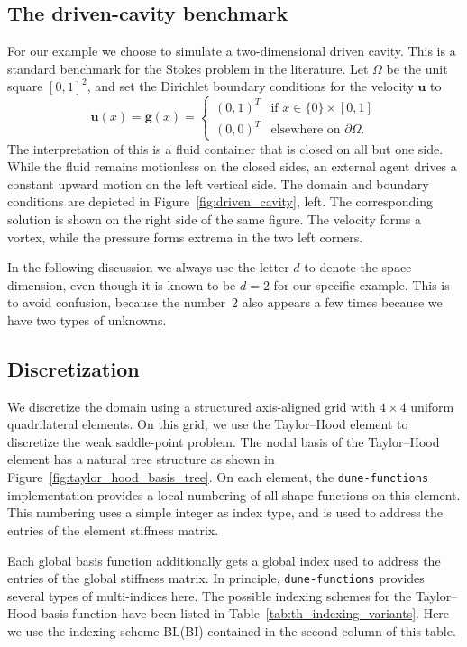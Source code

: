 \documentclass[a4paper,10pt,headings=normal,bibliography=totoc]{scrartcl}
\newcommand{\dunemodule}[1]{\texttt{#1}}
\begin{document}
\subsection{The driven-cavity benchmark}

For our example we choose to simulate a two-dimensional driven cavity.  This is a standard benchmark
for the Stokes problem in the literature.  Let $\Omega$ be the unit square $[0,1]^2$, and set the Dirichlet
boundary conditions for the velocity $\mathbf{u}$ to
\begin{equation*}
 \mathbf{u}(x)
 =\mathbf{g}(x)
 =
 \begin{cases}
  (0,1)^T & \text{if $x \in \{0\} \times [0,1]$} \\
  (0,0)^T & \text{elsewhere on $\partial \Omega$}.
 \end{cases}
\end{equation*}
The interpretation of this is a fluid container that is closed on all but one side.  While the fluid remains
motionless on the closed sides, an external agent drives a constant upward motion on the left vertical side.
The domain and boundary conditions are depicted in Figure~\ref{fig:driven_cavity}, left.
The corresponding solution is shown on the right side of the same figure.  The velocity forms a vortex,
while the pressure forms extrema in the two left corners.

In the following discussion we always use the letter $d$ to denote the space dimension, even though it is
known to be $d=2$ for our specific example.  This is to avoid confusion, because the number~2 also
appears a few times because we have two types of unknowns.

\subsection{Discretization}

We discretize the domain using a structured axis-aligned grid with $4 \times 4$ uniform quadrilateral elements.
On this grid, we use the Taylor--Hood element to discretize the weak saddle-point problem.  The nodal basis
of the Taylor--Hood element has a natural tree structure as shown in Figure~\ref{fig:taylor_hood_basis_tree}.
On each element, the \dunemodule{dune-functions} implementation provides a local numbering of all shape functions
on this element.  This numbering uses a simple integer as index type, and is used to address the entries of the
element stiffness matrix.

Each global basis function additionally gets a global index used to address the entries of the global stiffness
matrix.  In principle, \dunemodule{dune-functions} provides several types of multi-indices here.
The possible indexing schemes for the Taylor--Hood basis function have been listed in
Table~\ref{tab:th_indexing_variants}.
Here we use the indexing scheme BL(BI) contained in the second column of this table.
\end{document}
